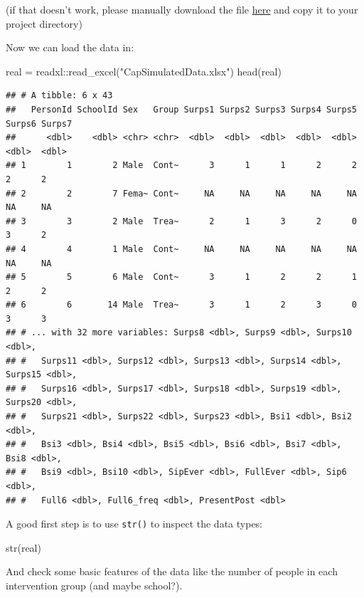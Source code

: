 \documentclass[
]{book}
\newenvironment{Shaded}{\begin{snugshade}}{\end{snugshade}}
\newcommand{\FunctionTok}[1]{\textcolor[rgb]{0.00,0.00,0.00}{#1}}
\newcommand{\NormalTok}[1]{#1}
\newcommand{\OtherTok}[1]{\textcolor[rgb]{0.56,0.35,0.01}{#1}}
\newcommand{\SpecialCharTok}[1]{\textcolor[rgb]{0.00,0.00,0.00}{#1}}
\newcommand{\StringTok}[1]{\textcolor[rgb]{0.31,0.60,0.02}{#1}}
\begin{document}
(if that doesn't work, please manually download the file
\href{https://gitlab.com/warsquid/rad/raw/master/data/CapSimulatedData.xlsx}{here}
and copy it to your project directory)

Now we can load the data in:

\begin{Shaded}
\begin{Highlighting}[]
\NormalTok{real }\OtherTok{=}\NormalTok{ readxl}\SpecialCharTok{::}\FunctionTok{read\_excel}\NormalTok{(}\StringTok{"CapSimulatedData.xlsx"}\NormalTok{)}
\FunctionTok{head}\NormalTok{(real)}
\end{Highlighting}
\end{Shaded}

\begin{verbatim}
## # A tibble: 6 x 43
##   PersonId SchoolId Sex   Group Surps1 Surps2 Surps3 Surps4 Surps5 Surps6 Surps7
##      <dbl>    <dbl> <chr> <chr>  <dbl>  <dbl>  <dbl>  <dbl>  <dbl>  <dbl>  <dbl>
## 1        1        2 Male  Cont~      3      1      1      2      2      2      2
## 2        2        7 Fema~ Cont~     NA     NA     NA     NA     NA     NA     NA
## 3        3        2 Male  Trea~      2      1      3      2      0      3      2
## 4        4        1 Male  Cont~     NA     NA     NA     NA     NA     NA     NA
## 5        5        6 Male  Cont~      3      1      2      2      1      2      2
## 6        6       14 Male  Trea~      3      1      2      3      0      3      3
## # ... with 32 more variables: Surps8 <dbl>, Surps9 <dbl>, Surps10 <dbl>,
## #   Surps11 <dbl>, Surps12 <dbl>, Surps13 <dbl>, Surps14 <dbl>, Surps15 <dbl>,
## #   Surps16 <dbl>, Surps17 <dbl>, Surps18 <dbl>, Surps19 <dbl>, Surps20 <dbl>,
## #   Surps21 <dbl>, Surps22 <dbl>, Surps23 <dbl>, Bsi1 <dbl>, Bsi2 <dbl>,
## #   Bsi3 <dbl>, Bsi4 <dbl>, Bsi5 <dbl>, Bsi6 <dbl>, Bsi7 <dbl>, Bsi8 <dbl>,
## #   Bsi9 <dbl>, Bsi10 <dbl>, SipEver <dbl>, FullEver <dbl>, Sip6 <dbl>,
## #   Full6 <dbl>, Full6_freq <dbl>, PresentPost <dbl>
\end{verbatim}

A good first step is to use \texttt{str()} to inspect the data types:

\begin{Shaded}
\begin{Highlighting}[]
\FunctionTok{str}\NormalTok{(real)}
\end{Highlighting}
\end{Shaded}

And check some basic features of the data like the number of people
in each intervention group (and maybe school?).
\end{document}
